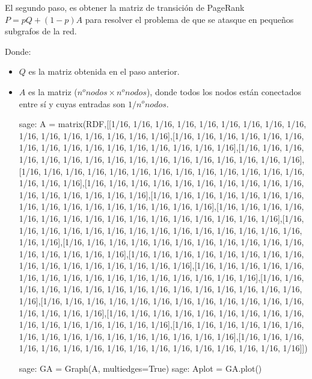 \par El segundo paso, es obtener la matriz de transición de PageRank $P=pQ + (1-p)A$ para resolver el 
problema de que se atasque en pequeños subgrafos de la red.
\par Donde:
\begin{itemize}
    \item $Q$ es la matriz obtenida en el paso anterior.
    \item $A$ es la matriz ($n^onodos \times n^onodos$), donde todos los nodos están conectados entre sí y cuyas 
    entradas son $1/n^o nodos$.
    \begin{sagecommandline}
        sage: A = matrix(RDF,[[1/16, 1/16, 1/16, 1/16, 1/16, 1/16, 1/16, 1/16, 1/16, 1/16, 1/16, 1/16, 1/16, 1/16, 1/16, 1/16],[1/16, 1/16, 1/16, 1/16, 1/16, 1/16, 1/16, 1/16, 1/16, 1/16, 1/16, 1/16, 1/16, 1/16, 1/16, 1/16],[1/16, 1/16, 1/16, 1/16, 1/16, 1/16, 1/16, 1/16, 1/16, 1/16, 1/16, 1/16, 1/16, 1/16, 1/16, 1/16],[1/16, 1/16, 1/16, 1/16, 1/16, 1/16, 1/16, 1/16, 1/16, 1/16, 1/16, 1/16, 1/16, 1/16, 1/16, 1/16],[1/16, 1/16, 1/16, 1/16, 1/16, 1/16, 1/16, 1/16, 1/16, 1/16, 1/16, 1/16, 1/16, 1/16, 1/16, 1/16],[1/16, 1/16, 1/16, 1/16, 1/16, 1/16, 1/16, 1/16, 1/16, 1/16, 1/16, 1/16, 1/16, 1/16, 1/16, 1/16],[1/16, 1/16, 1/16, 1/16, 1/16, 1/16, 1/16, 1/16, 1/16, 1/16, 1/16, 1/16, 1/16, 1/16, 1/16, 1/16],[1/16, 1/16, 1/16, 1/16, 1/16, 1/16, 1/16, 1/16, 1/16, 1/16, 1/16, 1/16, 1/16, 1/16, 1/16, 1/16],[1/16, 1/16, 1/16, 1/16, 1/16, 1/16, 1/16, 1/16, 1/16, 1/16, 1/16, 1/16, 1/16, 1/16, 1/16, 1/16],[1/16, 1/16, 1/16, 1/16, 1/16, 1/16, 1/16, 1/16, 1/16, 1/16, 1/16, 1/16, 1/16, 1/16, 1/16, 1/16],[1/16, 1/16, 1/16, 1/16, 1/16, 1/16, 1/16, 1/16, 1/16, 1/16, 1/16, 1/16, 1/16, 1/16, 1/16, 1/16],[1/16, 1/16, 1/16, 1/16, 1/16, 1/16, 1/16, 1/16, 1/16, 1/16, 1/16, 1/16, 1/16, 1/16, 1/16, 1/16],[1/16, 1/16, 1/16, 1/16, 1/16, 1/16, 1/16, 1/16, 1/16, 1/16, 1/16, 1/16, 1/16, 1/16, 1/16, 1/16],[1/16, 1/16, 1/16, 1/16, 1/16, 1/16, 1/16, 1/16, 1/16, 1/16, 1/16, 1/16, 1/16, 1/16, 1/16, 1/16],[1/16, 1/16, 1/16, 1/16, 1/16, 1/16, 1/16, 1/16, 1/16, 1/16, 1/16, 1/16, 1/16, 1/16, 1/16, 1/16],[1/16, 1/16, 1/16, 1/16, 1/16, 1/16, 1/16, 1/16, 1/16, 1/16, 1/16, 1/16, 1/16, 1/16, 1/16, 1/16]])
    \end{sagecommandline} 
    \begin{sagecommandline}
        sage: GA = Graph(A, multiedges=True)
        sage: Aplot = GA.plot()
    \end{sagecommandline}
    

\end{itemize}
